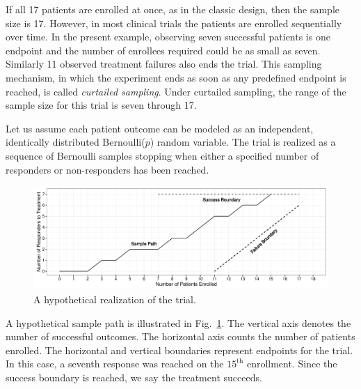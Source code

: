 \documentclass[review]{elsarticle}
\begin{document}
If all 17 patients are enrolled at once, as in the classic
design, then the sample size is 17. However, in most clinical trials the
patients are enrolled sequentially over time.
In the present example, observing seven
successful patients is one endpoint and the number of enrollees required
could be as small as seven. Similarly 11
observed treatment failures also ends the trial. This sampling mechanism, in
which the experiment ends as soon as any predefined endpoint is reached, is
called {\em curtailed sampling}. Under curtailed sampling, the range of the
sample size for this trial is seven through 17.

Let us assume each patient outcome can be modeled as an independent,
identically distributed Bernoulli($p$) random variable. The trial is realized
as a sequence of Bernoulli samples stopping when either a
specified number of responders or non-responders has been reached. 

\begin{figure}[bp!]
\includegraphics[width=\textwidth]{KanePlot.pdf}
\caption{
A hypothetical realization of the trial.
}
\label{fig:kane_viz}
\end{figure}

A hypothetical sample path is illustrated in Fig.~\ref{fig:kane_viz}.
The vertical axis denotes the number of
successful outcomes. The horizontal axis counts the number of patients 
enrolled. The horizontal and vertical boundaries represent
endpoints for the trial. In this case, a seventh response was reached on
the $15^{\text{th}}$ enrollment.
Since the success boundary is reached, we say the treatment succeeds.

\end{document}

